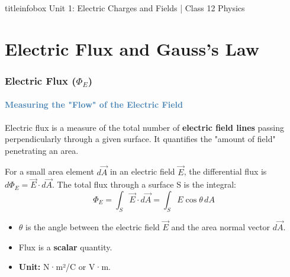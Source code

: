 \begin{frame}
\begin{frame}
\vfill

\begin{beamercolorbox}[wd=\textwidth,ht=0.5cm,dp=0.1cm,center]{titleinfobox}
    \small\color{coolgray} Unit 1: Electric Charges and Fields | Class 12 Physics
\end{beamercolorbox}
\end{frame}

\section{Electric Flux and Gauss's Law}

\begin{frame}
\frametitle{\textsf{\textbf{Electric Flux ($\Phi_E$)}}}
\framesubtitle{\textcolor{steelblue}{Measuring the "Flow" of the Electric Field}}

\begin{keybox}
\vspace{0.1cm}
Electric flux is a measure of the total number of \textbf{electric field lines} passing perpendicularly through a given surface. It quantifies the "amount of field" penetrating an area.
\vspace{0.1cm}
\end{keybox}

\vspace{0.3cm}

\begin{formulabox}
\vspace{0.1cm}
For a small area element $d\vec{A}$ in an electric field $\vec{E}$, the differential flux is $d\Phi_E = \vec{E} \cdot d\vec{A}$. The total flux through a surface S is the integral:
\begin{equation*}
\boxed{\Phi_E = \int_S \vec{E} \cdot d\vec{A} = \int_S E \cos\theta \, dA}
\end{equation*}
\begin{itemize}
    \item $\theta$ is the angle between the electric field $\vec{E}$ and the area normal vector $d\vec{A}$.
    \item Flux is a \textbf{scalar} quantity.
    \item \textbf{Unit:} N·m²/C or V·m.
\end{itemize}
\vspace{0.1cm}
\end{formulabox}


\end{frame}
\end{frame}

